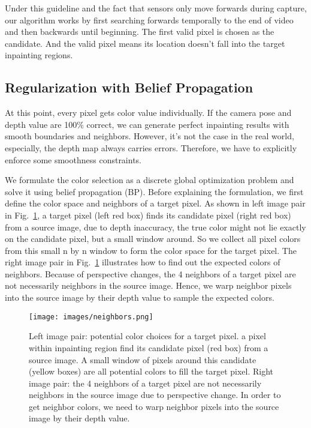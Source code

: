 \documentclass[runningheads]{llncs}
\begin{document}
Under this guideline and the fact that sensors only move forwards during capture, our algorithm works by first searching forwards temporally to the end of video and then backwards until beginning. The first valid pixel is chosen as the candidate. And the valid pixel means its location doesn't fall into the target inpainting regions. 

\subsection{Regularization with Belief Propagation}

At this point, every pixel gets color value individually. If the camera pose and depth value are 100\% correct, we can generate perfect inpainting results with smooth boundaries and neighbors. However, it's not the case in the real world, especially, the depth map always carries errors. Therefore, we have to explicitly enforce some smoothness constraints. 

We formulate the color selection as a discrete global optimization problem and solve it using belief propagation (BP). Before explaining the formulation, we first define the color space and neighbors of a target pixel. As shown in left image pair in Fig.~\ref{fig:neighbors}, a target pixel (left red box) finds its candidate pixel (right red box) from a source image, due to depth inaccuracy, the true color might not lie exactly on the candidate pixel, but a small window around. So we collect all pixel colors from this small n by n window to form the color space for the target pixel. The right image pair in Fig.~\ref{fig:neighbors} illustrates how to find out the expected colors of neighbors. Because of perspective changes, the 4 neighbors of a target pixel are not necessarily neighbors in the source image. Hence, we warp neighbor pixels into the source image by their depth value to sample the expected colors.
\begin{figure}[t!]
\centering
\texttt{[image: images/neighbors.png]}
   \caption{Left image pair: potential color choices for a target pixel. a pixel within inpainting region find its candidate pixel (red box) from a source image. A small window of pixels around this candidate (yellow boxes) are all potential colors to fill the target pixel. Right image pair: the 4 neighbors of a target pixel are not necessarily neighbors in the source image due to perspective change. In order to get neighbor colors, we need to warp neighbor pixels into the source image by their depth value. }
\label{fig:neighbors}
\end{figure}
\end{document}
